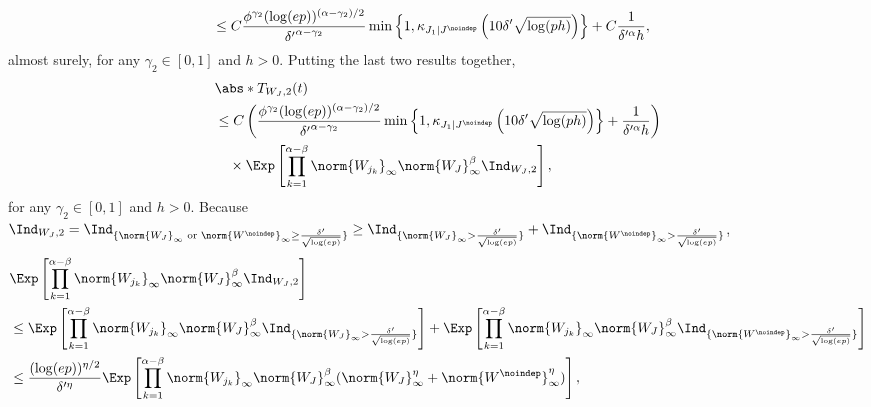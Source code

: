 \documentclass[aos]{imsart}
\begin{document}
\begin{appendix}
\begin{equation*}
\begin{aligned}
    & \leq C \frac{\phi^{\gamma_2} (\log(ep))^{(\alpha-\gamma_2)/2}}{{\delta'}^{\alpha-\gamma_2}}
    \min\left\{1, \kappa_{J_1|J^\noindep}\left(10\delta'\sqrt{\log(ph)}\right)\right\} + C \frac{1}{\delta'^\alpha h},
\end{aligned}
\end{equation*}
almost surely, for any $\gamma_2 \in [0,1]$ and $h > 0$. Putting the last two results together,
\begin{equation*}
\begin{aligned}
    & \abs*{T_{W_J,2}(t)} \\
    & \leq C \left(
        \frac{\phi^{\gamma_2} (\log(ep))^{(\alpha-\gamma_2)/2}}{{\delta'}^{\alpha-\gamma_2}}
        \min\left\{1, \kappa_{J_1|J^\noindep}\left(10\delta'\sqrt{\log(ph)}\right)\right\} 
        + \frac{1}{\delta'^\alpha h}
    \right) \\
    & \quad \times \Exp\left[\begin{aligned}
        \prod_{k=1}^{\alpha-\beta} \norm{W_{j_k}}_\infty \norm{W_J}_\infty^{\beta} \Ind_{W_J, 2}
    \end{aligned}\right], \\
\end{aligned}
\end{equation*}
for any $\gamma_2 \in [0,1]$ and $h > 0$.
Because $\Ind_{W_J,2} = \Ind_{\{\norm{W_J}_\infty \text{ or } \norm{W^{\noindep}}_\infty \geq \frac{\delta'}{\sqrt{\log(ep)}}\}} \geq \Ind_{\{\norm{W_J}_\infty > \frac{\delta'}{\sqrt{\log(ep)}}\}} + \Ind_{\{\norm{W^\noindep}_\infty > \frac{\delta'}{\sqrt{\log(ep)}}\}}$,
\begin{equation*}
\begin{aligned}
    & \Exp\left[ \prod_{k=1}^{\alpha-\beta} \norm{W_{j_k}}_\infty \norm{W_J}_\infty^{\beta} \Ind_{W_J, 2} \right] \\
    & \leq \Exp\left[ \prod_{k=1}^{\alpha-\beta} \norm{W_{j_k}}_\infty \norm{W_J}_\infty^{\beta} 
    \Ind_{\{\norm{W_J}_\infty > \frac{\delta'}{\sqrt{\log(ep)}}\}} \right]
    + \Exp\left[ \prod_{k=1}^{\alpha-\beta} \norm{W_{j_k}}_\infty \norm{W_J}_\infty^{\beta} 
    \Ind_{\{\norm{W^\noindep}_\infty > \frac{\delta'}{\sqrt{\log(ep)}}\}} \right] \\
    & \leq \frac{(\log(ep))^{\eta/2}}{\delta'^{\eta}} \Exp\left[ 
        \prod_{k=1}^{\alpha-\beta} \norm{W_{j_k}}_\infty \norm{W_J}_\infty^{\beta}
        (\norm{W_J}_\infty^{\eta} + \norm{W^\noindep}_\infty^{\eta}) 
    \right], \\

\end{aligned}
\end{equation*}
\end{appendix}
\end{document}

